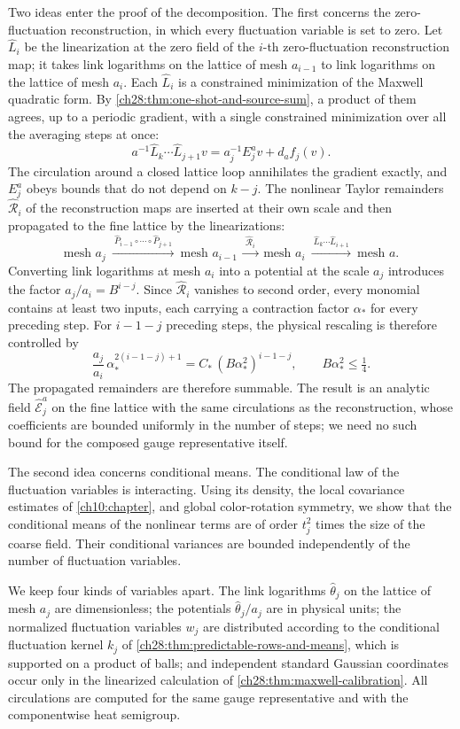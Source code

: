 Two ideas enter the proof of the decomposition. The first concerns the zero-fluctuation reconstruction, in which every fluctuation variable is set to zero. Let $\widehat L_i$ be the linearization at the zero field of the $i$-th zero-fluctuation reconstruction map; it takes link logarithms on the lattice of mesh $a_{i-1}$ to link logarithms on the lattice of mesh $a_i$. Each $\widehat L_i$ is a constrained minimization of the Maxwell quadratic form. By \cref{ch28:thm:one-shot-and-source-sum}, a product of them agrees, up to a periodic gradient, with a single constrained minimization over all the averaging steps at once:
\[
 a^{-1}\widehat L_k\cdots\widehat L_{j+1}v=a_j^{-1}E_j^av+d_af_j(v).
\]
The circulation around a closed lattice loop annihilates the gradient exactly, and $E_j^a$ obeys bounds that do not depend on $k-j$. The nonlinear Taylor remainders $\widehat{\mathcal R}_i$ of the reconstruction maps are inserted at their own scale and then propagated to the fine lattice by the linearizations:
\[
 \text{mesh }a_j\ \xrightarrow{\ \widehat P_{i-1}\circ\cdots\circ\widehat P_{j+1}\ }\ \text{mesh }a_{i-1}\ \xrightarrow{\ \widehat{\mathcal R}_i\ }\ \text{mesh }a_i\ \xrightarrow{\ \widehat L_k\cdots\widehat L_{i+1}\ }\ \text{mesh }a.
\]
Converting link logarithms at mesh $a_i$ into a potential at the scale $a_j$ introduces the factor $a_j/a_i=B^{i-j}$. Since $\widehat{\mathcal R}_i$ vanishes to second order, every monomial contains at least two inputs, each carrying a contraction factor $\alpha_*$ for every preceding step. For $i-1-j$ preceding steps, the physical rescaling is therefore controlled by
\[
 \frac{a_j}{a_i}\,\alpha_*^{2(i-1-j)+1}=C_*\,(B\alpha_*^2)^{i-1-j},\qquad B\alpha_*^2\le\tfrac14.
\]
The propagated remainders are therefore summable. The result is an analytic field $\widehat{\mathcal E}_j^a$ on the fine lattice with the same circulations as the reconstruction, whose coefficients are bounded uniformly in the number of steps; we need no such bound for the composed gauge representative itself.

The second idea concerns conditional means. The conditional law of the fluctuation variables is interacting. Using its density, the local covariance estimates of \cref{ch10:chapter}, and global color-rotation symmetry, we show that the conditional means of the nonlinear terms are of order $t_j^2$ times the size of the coarse field. Their conditional variances are bounded independently of the number of fluctuation variables.

We keep four kinds of variables apart. The link logarithms $\widehat\theta_j$ on the lattice of mesh $a_j$ are dimensionless; the potentials $\widehat\theta_j/a_j$ are in physical units; the normalized fluctuation variables $w_j$ are distributed according to the conditional fluctuation kernel $k_j$ of \cref{ch28:thm:predictable-rows-and-means}, which is supported on a product of balls; and independent standard Gaussian coordinates occur only in the linearized calculation of \cref{ch28:thm:maxwell-calibration}. All circulations are computed for the same gauge representative and with the componentwise heat semigroup.

